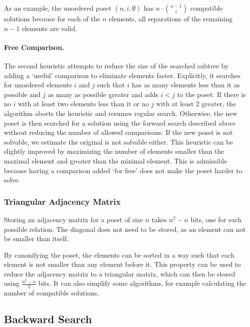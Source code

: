 \documentclass[twoside,leqno,twocolumn]{article}
\begin{document}
As an example, the unordered poset $(n,i,\emptyset)$ has $n \cdot \binom{n - 1}{i}$ compatible solutions because
for each of the $n$ elements, all separations of the remaining $n - 1$ elements
are valid.


\paragraph{Free Comparison.}
The second heuristic attempts to reduce the size of the searched subtree by adding a `useful' comparison to eliminate elements faster.
Explicitly, it searches for unordered elements $i$ and $j$ such that $i$ has as many elements less than it as possible and $j$ as many as possible greater and adds $i < j$ to the poset.
If there is no $i$ with at least two elements less than it or no $j$ with at least 2 greater, the algorithm aborts the heuristic and resumes regular search.
Otherwise, the new poset is then searched for a solution using the forward search described above without reducing the number of allowed comparisons.
If the new poset is not solvable, we estimate the original is not solvable either.
This heuristic can be slightly improved by maximizing the number of elements smaller than the maximal element and greater than the minimal element.
This is admissible because having a comparison added `for free' does not make the poset harder to solve.

\subsubsection{Triangular Adjacency Matrix}
Storing an adjacency matrix for a poset of size $n$ takes $n^2 - n$ bits, one for each possible relation.
The diagonal does not need to be stored, as an element can not be smaller than itself.

By canonifying the poset, the elements can be sorted in a way such that each element is not smaller than any element before it.
This property can be used to reduce the adjacency matrix to a triangular matrix, which can then be stored using $\frac{n^2 - n}{2}$ bits.
It can also simplify some algorithms, for example calculating the number of compatible solutions.

\subsection{Backward Search} \label{sec:backward}
\end{document}
